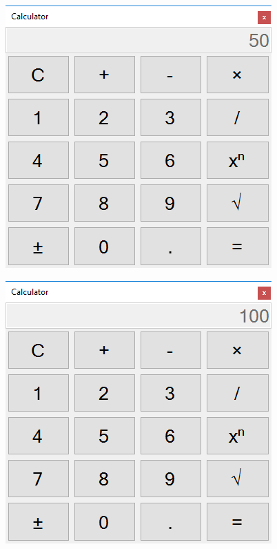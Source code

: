 \begin{figure}[ht]
 \includegraphics[scale=1]{imagini/2-write}
 \centering
\end{figure}

\begin{figure}[ht]
 \includegraphics[scale=1]{imagini/3-50+50}
 \centering
\end{figure}

